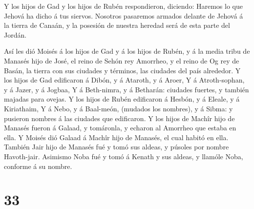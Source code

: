  Y los hijos de Gad y los hijos de Rubén respondieron,
diciendo: Haremos lo que Jehová ha dicho á tus siervos. 
Nosotros pasaremos armados delante de Jehová á la tierra de Canaán, y la
posesión de nuestra heredad será de esta parte del Jordán.

 Así les dió Moisés á los hijos de Gad y á los hijos de
Rubén, y á la media tribu de Manasés hijo de José, el reino de Sehón rey
Amorrheo, y el reino de Og rey de Basán, la tierra con sus ciudades y
términos, las ciudades del país alrededor.  Y los hijos de
Gad edificaron á Dibón, y á Ataroth, y á Aroer,  Y á
Atroth-sophan, y á Jazer, y á Jogbaa,  Y á Beth-nimra, y á
Betharán: ciudades fuertes, y también majadas para ovejas. 
Y los hijos de Rubén edificaron á Hesbón, y á Eleale, y á Kiriathaim,
 Y á Nebo, y á Baal-meón, (mudados los nombres), y á Sibma:
y pusieron nombres á las ciudades que edificaron.  Y los
hijos de Machîr hijo de Manasés fueron á Galaad, y tomáronla, y echaron
al Amorrheo que estaba en ella.  Y Moisés dió Galaad á
Machîr hijo de Manasés, el cual habitó en ella.  También
Jair hijo de Manasés fué y tomó sus aldeas, y púsoles por nombre
Havoth-jair.  Asimismo Noba fué y tomó á Kenath y sus
aldeas, y llamóle Noba, conforme á su nombre.

\hypertarget{section-32}{%
\section{33}\label{section-32}}

